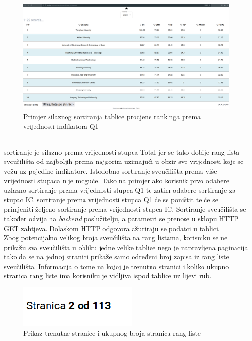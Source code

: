 \documentclass[times, utf8, zavrsni]{fer}
\begin{document}
\begin{figure}[htb]
    \hspace*{-2cm}  
       \includegraphics[scale=0.21]{sort2.png} 
       \caption{Primjer silaznog sortiranja tablice procjene rankinga prema vrijednosti indikatora Q1}
       \label{fig:sort2}
       \end{figure}
\\ sortiranje je silazno prema vrijednosti stupca Total jer se tako dobije rang lista sveučilišta od najboljih prema najgorim uzimajući u obzir sve 
vrijednosti koje se vežu uz pojedine indikatore.
Istodobno sortiranje sveučilišta prema više vrijednosti stupaca nije moguće. Tako na primjer ako korisnik prvo odabere uzlazno sortiranje prema vrijednosti stupca 
Q1 te zatim odabere sortiranje za stupac IC, sortiranje prema vrijednosti stupca Q1 će se poništit te će se primjeniti željeno sortiranje prema vrijednosti stupca IC.
Sortiranje sveučilišta se također odvija na 
\emph{backend} poslužitelju, a parametri se prenose u sklopu HTTP GET zahtjeva. Dolaskom HTTP odgovora ažuriraju se podatci u tablici.
\\Zbog potencijalno velikog broja sveučilišta na rang listama, korisniku se ne prikažu sva sveučilišta u obliku jedne velike tablice nego 
je napravljena paginacija tako da se na jednoj stranici prikaže samo određeni broj zapisa iz rang liste sveučilišta. Informacija o tome na kojoj je trenutno stranici i 
koliko ukupno stranica rang liste ima korisniku je vidljiva ispod tablice uz lijevi rub. 
\begin{figure}[htb]
    \centering
       \includegraphics[scale=0.3]{stranica.png} 
       \caption{Prikaz trenutne stranice i ukupnog broja stranica rang liste}
       \label{fig:paginacija}
       \end{figure}
\end{document}

